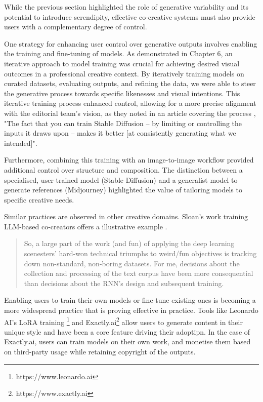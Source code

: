 While the previous section highlighted the role of generative variability and its potential to introduce serendipity, effective co-creative systems must also provide users with a complementary degree of control. 

One strategy for enhancing user control over generative outputs involves enabling the training and fine-tuning of models. As demonstrated in Chapter 6, an iterative approach to model training was crucial for achieving desired visual outcomes in a professional creative context. By iteratively training models on curated datasets, evaluating outputs, and refining the data, we were able to steer the generative process towards specific likenesses and visual intentions. This iterative training process enhanced control, allowing for a more precise alignment with the editorial team's vision, as they noted in an article covering the process \cite{Drummond2023-bh}, "The fact that you can train Stable Diffusion – by limiting or controlling the inputs it draws upon – makes it better [at consistently generating what we intended]".

Furthermore, combining this training with an image-to-image workflow provided additional control over structure and composition. The distinction between a specialised, user-trained model (Stable Diffusion) and a generalist model to generate references (Midjourney) highlighted the value of tailoring models to specific creative needs.

Similar practices are observed in other creative domains. Sloan's work training LLM-based co-creators offers a illustrative example \cite{Sloan2016-fj}. 

\begin{quote}
So, a large part of the work (and fun) of applying the deep learning scenesters' hard-won technical triumphs to weird/fun objectives is tracking down non-standard, non-boring datasets. For me, decisions about the collection and processing of the text corpus have been more consequential than decisions about the RNN's design and subsequent training.
\end{quote}

Enabling users to train their own models or fine-tune existing ones is becoming a more widespread practice that is proving effective in practice. Tools like Leonardo AI's LoRA training \footnote{https://www.leonardo.ai} and Exactly.ai\footnote{https://www.exactly.ai} allow users to generate content in their unique style and have been a core feature driving their adoptipn. In the case of Exactly.ai, users can train models on their own work, and monetise them based on third-party usage while retaining copyright of the outputs.

